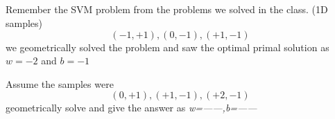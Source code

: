 \begin{frame}
\section{}
Remember the SVM problem from the problems we solved in the class. (1D samples)
\[ (-1,+1), (0,-1), (+1,-1) \]
we geometrically solved the problem and saw the optimal primal solution as $w=-2$ and $b=-1$

Assume the samples were
\[ (0,+1), (+1,-1), (+2,-1) \]
geometrically solve and give the answer as \textit{w=------,b=------}



\end{frame}

